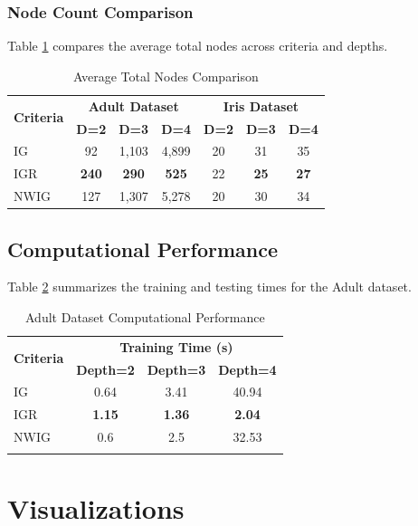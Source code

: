 \documentclass{article}
\begin{document}
\subsubsection{Node Count Comparison}
Table \ref{tab:nodes_comparison} compares the average total nodes across criteria and depths.

\begin{table}[H]
\centering
\caption{Average Total Nodes Comparison}
\label{tab:nodes_comparison}
\begin{tabular}{@{}lcccccc@{}}
\toprule
\multirow{2}{*}{\textbf{Criteria}} & \multicolumn{3}{c}{\textbf{Adult Dataset}} & \multicolumn{3}{c}{\textbf{Iris Dataset}} \\
\cmidrule(lr){2-4} \cmidrule(lr){5-7}
& \textbf{D=2} & \textbf{D=3} & \textbf{D=4} & \textbf{D=2} & \textbf{D=3} & \textbf{D=4} \\
\midrule
IG & 92 & 1,103 & 4,899 & 20 & 31 & 35 \\
IGR & \textbf{240} & \textbf{290} & \textbf{525} & 22 & \textbf{25} & \textbf{27} \\
NWIG & 127 & 1,307 & 5,278 & 20 & 30 & 34 \\
\bottomrule
\end{tabular}
\end{table}

\subsection{Computational Performance}
Table \ref{tab:timing} summarizes the training and testing times for the Adult dataset.

\begin{longtable}{lccc}
\hline
\multirow{2}{*}{\textbf{Criteria}} & \multicolumn{3}{c}{\textbf{Training Time (s)}} \\ \cline{2-4} 
 & \textbf{Depth=2} & \textbf{Depth=3} & \textbf{Depth=4} \\ \hline
\endhead
%
IG & 0.64 & 3.41 & 40.94 \\
IGR & \textbf{1.15} & \textbf{1.36} & \textbf{2.04} \\
NWIG & 0.6 & 2.5 & 32.53 \\ \hline
\caption{Adult Dataset Computational Performance}
\label{tab:timing}\\
\end{longtable}

\section{Visualizations}
\end{document}
